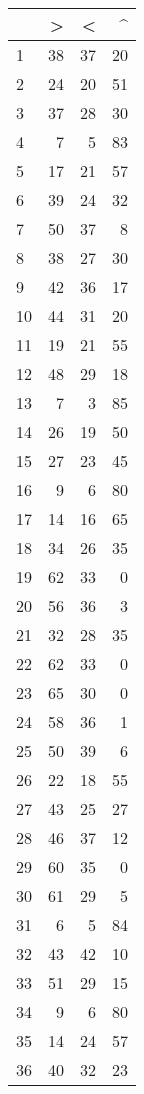 \begin{tabular}{lrrr}
\toprule
{} &   > &   < &   \textasciicircum  \\
\midrule
1  &  38 &  37 &  20 \\
2  &  24 &  20 &  51 \\
3  &  37 &  28 &  30 \\
4  &   7 &   5 &  83 \\
5  &  17 &  21 &  57 \\
6  &  39 &  24 &  32 \\
7  &  50 &  37 &   8 \\
8  &  38 &  27 &  30 \\
9  &  42 &  36 &  17 \\
10 &  44 &  31 &  20 \\
11 &  19 &  21 &  55 \\
12 &  48 &  29 &  18 \\
13 &   7 &   3 &  85 \\
14 &  26 &  19 &  50 \\
15 &  27 &  23 &  45 \\
16 &   9 &   6 &  80 \\
17 &  14 &  16 &  65 \\
18 &  34 &  26 &  35 \\
19 &  62 &  33 &   0 \\
20 &  56 &  36 &   3 \\
21 &  32 &  28 &  35 \\
22 &  62 &  33 &   0 \\
23 &  65 &  30 &   0 \\
24 &  58 &  36 &   1 \\
25 &  50 &  39 &   6 \\
26 &  22 &  18 &  55 \\
27 &  43 &  25 &  27 \\
28 &  46 &  37 &  12 \\
29 &  60 &  35 &   0 \\
30 &  61 &  29 &   5 \\
31 &   6 &   5 &  84 \\
32 &  43 &  42 &  10 \\
33 &  51 &  29 &  15 \\
34 &   9 &   6 &  80 \\
35 &  14 &  24 &  57 \\
36 &  40 &  32 &  23 \\
\bottomrule
\end{tabular}
